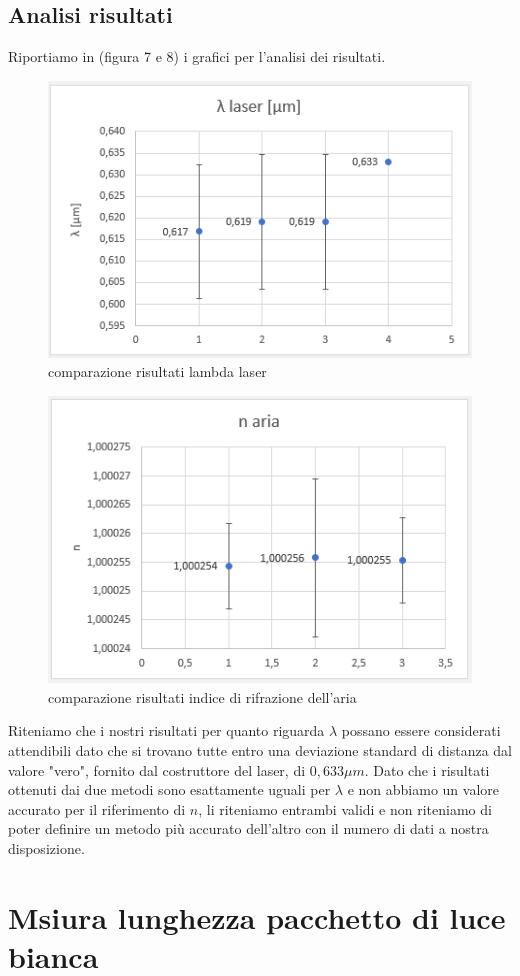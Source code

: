 \documentclass{article}
\begin{document}
\subsection{Analisi risultati}
Riportiamo in (figura 7 e 8) i grafici per l'analisi dei risultati.

\begin{figure}[h!]
  \centering
  \includegraphics[width=0.6\linewidth]{IM grafico risultati lambda}
  \caption{comparazione risultati lambda laser}
\end{figure}

\begin{figure}[h!]
  \centering
  \includegraphics[width=0.6\linewidth]{IM grafico risultati n}
  \caption{comparazione risultati indice di rifrazione dell'aria}
\end{figure}


Riteniamo che i nostri risultati per quanto riguarda $\lambda$ possano essere considerati attendibili dato che si trovano tutte entro una deviazione standard di distanza dal valore "vero", fornito dal costruttore del laser, di $0,633 \mu m$. Dato che i risultati ottenuti dai due metodi sono esattamente uguali per $\lambda$ e non abbiamo un valore accurato per il riferimento di $n$, li riteniamo entrambi validi e non riteniamo di poter definire un metodo più accurato dell'altro con il numero di dati a nostra disposizione. 




\section{Msiura lunghezza pacchetto di luce bianca}
\end{document}
